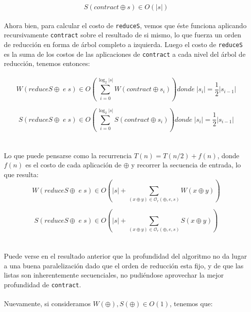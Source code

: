 \documentclass[a4paper,10pt]{article}
\begin{document}
		\begin{equation*}
			S \left( contract \oplus s \right) \in O \left( \vert s \vert \right)
		\end{equation*}
\\	
		Ahora bien, para calcular el costo de \texttt{reduceS}, vemos que éste funciona aplicando recursivamente \texttt{contract} sobre el resultado de si mismo, lo que fuerza un orden de reducción en forma de árbol completo a izquierda. Luego el costo de \texttt{reduceS} es la suma de los costos de las aplicaciones de \texttt{contract} a cada nivel del árbol de reducción, tenemos entonces:
\\
\\
	\begin{equation*}
		W \left( reduceS \oplus \; e\; s \right) \in O \left(\sum_{i=0}^{\log_2 \vert s \vert} W \left( contract \oplus s_i \right) \right) donde \; \vert s_i\vert = \frac{1}{2} \vert s_{i-1} \vert
	\end{equation*}

	\begin{equation*}
		S \left( reduceS \oplus  \; e \; s \right) \in O \left(\sum_{i=0}^{\log_2 \vert s \vert} S \left( contract \oplus s_i \right) \right) donde \; \vert s_i\vert = \frac{1}{2} \vert s_{i-1} \vert
	\end{equation*}
\\
\\	
	Lo que puede pensarse como la recurrencia $T(n) = T(n/2) + f(n)$, donde $f(n)$ es el costo de cada aplicación de $\oplus$ y recorrer la secuencia de entrada, lo que resulta:
\\	
	\begin{equation*}
    W \left( reduceS \oplus \; e \; s \right) \in
    O \left( \vert s \vert + \sum_{(x \oplus y) \in \mathcal{O}_r(\oplus,e,s)} W \left( x \oplus y \right) \right)
	\end{equation*}

	\begin{equation*}
    S \left( reduceS \oplus \; e \; s \right) \in
    O \left( \vert s \vert + \sum_{(x \oplus y) \in \mathcal{O}_r(\oplus,e,s)} S \left( x \oplus y \right) \right)
	\end{equation*}
\\
\\
		Puede verse en el resultado anterior que la profundidad del algoritmo no da lugar a una buena \linebreak paralelización dado que el orden de reducción esta fijo, y de que las listas son inherentemente secuenciales, no pudiéndose aprovechar la mejor profundidad de \texttt{contract}.
\\
\\
				Nuevamente, si consideramos $W(\oplus), S(\oplus) \in O(1)$, tenemos que:
		
\end{document}
